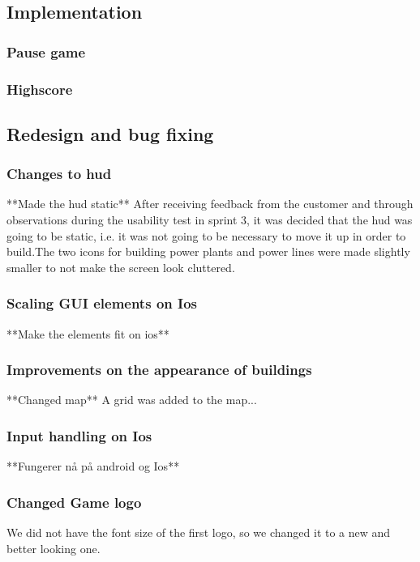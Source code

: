 \subsection{Implementation}

	\subsubsection*{Pause game}

	\subsubsection*{Highscore}

\subsection{Redesign and bug fixing}
	
	\subsubsection*{Changes to hud}
		**Made the hud static**
		After receiving feedback from the customer and through observations during the usability test in sprint 3, it was decided that the hud was going to be static, i.e. it was not going to be necessary to move it up in order to build.The two icons for building power plants and power lines were made slightly smaller to not make the screen look cluttered.
	\subsubsection*{Scaling GUI elements on Ios}
		**Make the elements fit on ios**
	\subsubsection*{Improvements on the appearance of buildings}
		**Changed map**
		A grid was added to the map...
	\subsubsection*{Input handling on Ios}
		**Fungerer nå på android og Ios**

	\subsubsection*{Changed Game logo}
		We did not have the font size of the first logo, so we changed it to a new 
		and better looking one. 

